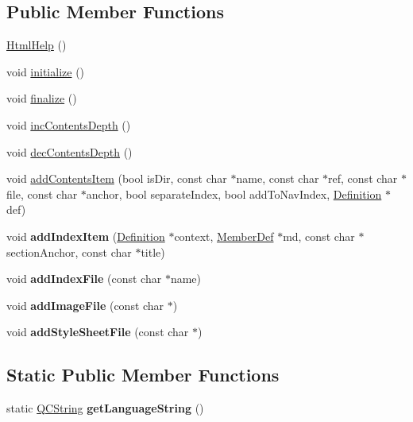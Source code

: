\subsection*{Public Member Functions}
\begin{DoxyCompactItemize}
\item 
\mbox{\hyperlink{class_html_help_a0d86f84971a446fc8c61c1a64f8eaaf8}{Html\+Help}} ()
\item 
void \mbox{\hyperlink{class_html_help_acf6cb7c477c71f2031b5831f979991d5}{initialize}} ()
\item 
void \mbox{\hyperlink{class_html_help_a66375adceef242d73c6554bd7fba6cf7}{finalize}} ()
\item 
void \mbox{\hyperlink{class_html_help_aca0008f8813f28f23ca5bcaea25a7bec}{inc\+Contents\+Depth}} ()
\item 
void \mbox{\hyperlink{class_html_help_ad76b300748e818d96676f0743738090d}{dec\+Contents\+Depth}} ()
\item 
void \mbox{\hyperlink{class_html_help_a254ac391f0b096f1c06b72205fca5d77}{add\+Contents\+Item}} (bool is\+Dir, const char $\ast$name, const char $\ast$ref, const char $\ast$file, const char $\ast$anchor, bool separate\+Index, bool add\+To\+Nav\+Index, \mbox{\hyperlink{class_definition}{Definition}} $\ast$def)
\item 
\mbox{\label{class_html_help_a547f7caa925db6b0f227176c695bd687}} 
void {\bfseries add\+Index\+Item} (\mbox{\hyperlink{class_definition}{Definition}} $\ast$context, \mbox{\hyperlink{class_member_def}{Member\+Def}} $\ast$md, const char $\ast$section\+Anchor, const char $\ast$title)
\item 
\mbox{\label{class_html_help_a713ba33425a3d63c89322cc513e01414}} 
void {\bfseries add\+Index\+File} (const char $\ast$name)
\item 
\mbox{\label{class_html_help_aba0ad9a05caf2ff7c310aaf751eb22e9}} 
void {\bfseries add\+Image\+File} (const char $\ast$)
\item 
\mbox{\label{class_html_help_a711b8605fb3b450234299747b5675a0b}} 
void {\bfseries add\+Style\+Sheet\+File} (const char $\ast$)
\end{DoxyCompactItemize}
\subsection*{Static Public Member Functions}
\begin{DoxyCompactItemize}
\item 
\mbox{\label{class_html_help_abf42fbc4569ef63596a1aa6269d19719}} 
static \mbox{\hyperlink{class_q_c_string}{Q\+C\+String}} {\bfseries get\+Language\+String} ()
\end{DoxyCompactItemize}

